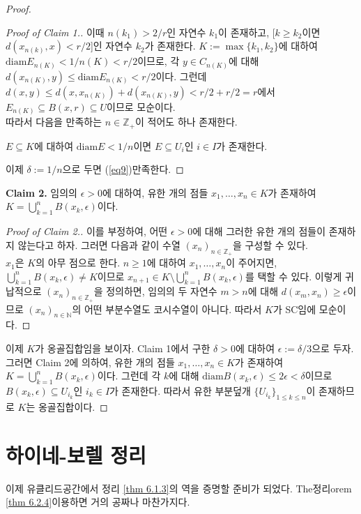 \documentclass[11pt]{book}
\numberwithin{equation}{chapter}
\def\NN{\mathbb{N}}
\def\ZZ{\mathbb{Z}}
\def\eps{\epsilon}
\def\diam{\text{diam}}
\theoremstyle{definition}
\begin{document}
\begin{proof}
\begin{proof}[Proof of Claim 1.]
    이때 \(n(k_1) > 2/r\)인 자연수 \(k_1\)이 존재하고, [\(k \ge k_2\)이면 \(d(x_{n(k)}, x) < r/2\)]인 자연수 \(k_2\)가 존재한다. \(K := \max \{k_1, k_2\}\)에 대하여 \(\diam E_{n(K)} < 1/n(K) < r/2\)이므로, 각 \(y \in C_{n(K)}\)에 대해 \(d(x_{n(K)}, y) \le \diam E_{n(K)} <  r/2\)이다. 그런데 \(d(x, y) \le d(x, x_{n(K)}) + d(x_{n(K)}, y) < r/2 + r/2 = r\)에서 \(E_{n(K)} \subseteq B(x, r) \subseteq U\)이므로 모순이다.\\
    따라서 다음을 만족하는 \(n \in \ZZ_+\)이 적어도 하나 존재한다.
    \begin{center}
        \(E \subseteq K\)에 대하여 \(\diam E < 1/n\)이면 \(E \subseteq U_i\)인 \(i \in I\)가 존재한다.
    \end{center}
    이제 \(\delta := 1/n\)으로 두면 (\ref{eq9})\를 만족한다.
    \end{proof}
    \noindent\textbf{Claim 2.} 임의의 \(\eps > 0\)에 대하여, 유한 개의 점들 \(x_1, \ldots, x_n \in K\)가 존재하여 \(K = \bigcup_{k=1}^n B(x_k, \eps)\)이다.
    \begin{proof}[Proof of Claim 2.]
        이를 부정하여, 어떤 \(\eps > 0\)에 대해 그러한 유한 개의 점들이 존재하지 않는다고 하자. 그러면 다음과 같이 수열 \((x_n)_{n \in \ZZ_+}\)을 구성할 수 있다.\\
    \(x_1\)은 \(K\)의 아무 점으로 한다. \(n \ge 1\)에 대하여 \(x_1, \ldots, x_n\)이 주어지면, \(\bigcup_{k=1}^n B(x_k, \eps) \ne K\)이므로 \(x_{n+1} \in K \setminus \bigcup_{k=1}^n B(x_k, \eps)\)를 택할 수 있다. 이렇게 귀납적으로 \((x_n)_{n \in \ZZ_+}\)을 정의하면, 임의의 두 자연수 \(m > n\)에 대해 \(d(x_m, x_n) \ge \eps\)이므로 \((x_n)_{n \in \NN}\)의 어떤 부분수열도 코시수열이 아니다. 따라서 \(K\)가 SC임에 모순이다.
    \end{proof}
    이제 \(K\)가 옹골집합임을 보이자. Claim 1에서 구한 \(\delta > 0\)에 대하여 \(\eps := \delta / 3\)으로 두자. 그러면 Claim 2에 의하여, 유한 개의 점들 \(x_1, \ldots, x_n \in K\)가 존재하여 \(K = \bigcup_{k=1}^n B(x_k, \eps)\)이다. 그런데 각 \(k\)에 대해 \(\diam B(x_k, \eps) \le 2\eps < \delta\)이므로 \(B(x_k, \eps) \subseteq U_{i_k}\)인 \(i_k \in I\)가 존재한다. 따라서 유한 부분덮개 \(\{U_{i_k}\}_{1 \le k \le n}\)이 존재하므로 \(K\)는 옹골집합이다.
\end{proof}

\section{하이네-보렐 정리} \label{sec 6.3}

이제 유클리드공간에서 정리 \ref{thm 6.1.3}의 역을 증명할 준비가 되었다. The정리orem \ref{thm 6.2.4}\를 이용하면 거의 공짜나 마찬가지다.
\end{document}
